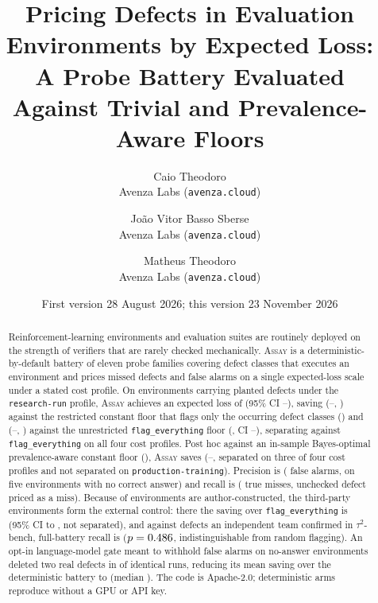 \documentclass[11pt]{article}
\title{Pricing Defects in Evaluation Environments by Expected Loss:\\
A Probe Battery Evaluated Against Trivial and Prevalence-Aware Floors}
\author{Caio Theodoro\\\small Avenza Labs (\texttt{avenza.cloud}) \and Jo\~{a}o Vitor Basso Sberse\\\small Avenza Labs (\texttt{avenza.cloud}) \and Matheus Theodoro\\\small Avenza Labs (\texttt{avenza.cloud})}
\date{First version 28 August 2026; this version 23 November 2026}
\newcommand{\assay}{\textsc{Assay}}
\newcommand{\fe}{\texttt{flag\_everything}}
\begin{document}
\maketitle

\begin{abstract}
\noindent
Reinforcement-learning environments and evaluation suites are routinely deployed on the strength of
verifiers that are rarely checked mechanically. \assay{} is a deterministic-by-default battery of
eleven probe families covering \nClasses{} defect classes that executes an environment and prices
missed defects and false alarms on a single expected-loss scale under a stated cost profile.
On \nEnv{} environments carrying \nPlanted{} planted defects under the \texttt{research-run}
profile, \assay{} achieves an expected loss of \lossAssay{} (95\% CI \loLossAssay--\hiLossAssay{}),
saving \savedRestricted{} (\loSavedRestricted--\hiSavedRestricted{}, \sepRestricted{}) against the
restricted constant floor that flags only the \nClassesPresent{} occurring defect classes
(\floorRestricted{}) and \savedFlagEverything{} (\loSavedFlagEverything--\hiSavedFlagEverything{},
\sepFlagEverything{}) against the unrestricted \fe{} floor (\lossFlagEverything{}, CI
\loLossFlagEverything--\hiLossFlagEverything{}), separating against \fe{} on all four cost
profiles. Post hoc against an in-sample Bayes-optimal prevalence-aware constant floor
(\lossPrevResearch{}), \assay{} saves \savedPrevResearch{} (\loSavedPrevResearch--\hiSavedPrevResearch{},
separated on three of four cost profiles and not separated on \texttt{production-training}).
Precision is \precAssay{} (\nSpurAssay{} false alarms, \assayCleanFA{} on five environments with no
correct answer) and recall is \recAssay{} (\missAssay{} true misses, \nUnchecked{} unchecked defect
priced as a miss). Because \nSelfAuthored{} of \nEnv{} environments are author-constructed, the
\nExternal{} third-party environments form the external control: there the saving over \fe{} is
\extSaved{} (95\% CI \extLoSaved{} to \extHiSaved{}, not separated), and against \tauPos{} defects
an independent team confirmed in $\tau^2$-bench, full-battery recall is \tauAllRec{} ($p=0.486$,
indistinguishable from random flagging). An opt-in language-model gate meant to withhold false
alarms on no-answer environments deleted two real defects in \gateBadRuns{} of \gateRuns{}
identical runs, reducing its mean saving over the deterministic battery to \gateMeanSaved{} (median
\gateMedianSaved{}). The code is Apache-2.0; deterministic arms reproduce without a GPU or API key.
\end{abstract}
\end{document}
